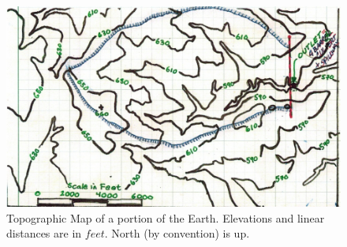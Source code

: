 \documentclass[12pt]{article}
\begin{document}
\begin{enumerate}
\begin{figure}[h!] %
   \centering
   \includegraphics[width=6.5in]{topoMap.jpg} 
   \caption{Topographic Map of a portion of the Earth.  Elevations and linear distances are in $feet$. North (by convention) is up.}
   \label{fig:topoMap.jpg}
\end{figure}


\end{enumerate}
\end{document}
